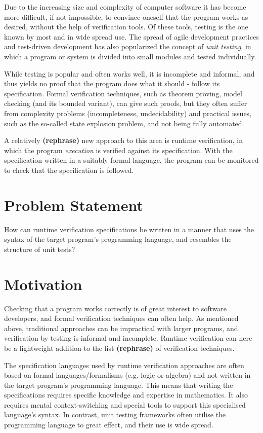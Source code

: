 \documentclass[a4paper,11pt]{kth-mag}
\newcommand{\rephrase}{\textbf{(rephrase)} }
\begin{document}
Due to the increasing size and complexity of computer software it has become more difficult,
if not impossible, to convince oneself that the program works as desired, without the help
of verification tools. Of these tools, testing is the one known by most and in wide spread use.
The spread of agile development practices and test-driven development has also popularized the
concept of \textit{unit testing}, in which a program or system is divided into small modules
and tested individually.

While testing is popular and often works well, it is incomplete and informal, and thus yields
no proof that the program does what it should - follow its specification. Formal verification
techniques, such as theorem proving, model checking (and its bounded variant), can give such
proofs, but they often suffer from complexity problems (incompleteness, undecidability) and
practical issues, such as the so-called state explosion problem, and not being fully automated.

A relatively \rephrase new approach to this area is runtime verification, in which the
program \textit{execution} is verified against its specification. With the specification written
in a suitably formal language, the program can be monitored to check that the specification is
followed.


\section{Problem Statement}

How can runtime verification specifications be written in a manner that uses
the syntax of the target program’s programming language, and resembles
the structure of unit tests?

\section{Motivation}

Checking that a program works correctly is of great interest to software developers, and
formal verification techniques can often help. As mentioned above, traditional approaches
can be impractical with larger programs, and verification by testing is
informal and incomplete. Runtime verification can here be a lightweight addition to the list \rephrase of verification techniques.

The specification languages used by runtime verification approaches are often based
on formal languages/formalisms (e.g. logic or algebra) and not written in the
target program's programming language.  This means that writing the specifications
requires specific knowledge and expertise in mathematics. 
It also requires mental context-switching and special tools
to support this specialised language's syntax. In contrast, unit testing frameworks often
utilise the programming language to great effect, and their use is wide spread.
\end{document}
